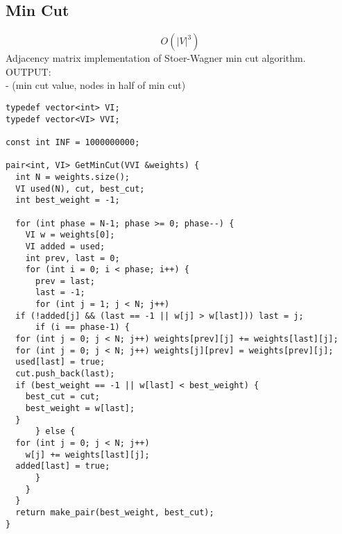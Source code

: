 \documentclass[11pt, oneside]{article}
\begin{document}
\subsection{Min Cut}
\[O(|V|^3)\]
Adjacency matrix implementation of Stoer-Wagner min cut algorithm.\\
OUTPUT:\\
    - (min cut value, nodes in half of min cut)\\
\begin{lstlisting}
typedef vector<int> VI;
typedef vector<VI> VVI;

const int INF = 1000000000;

pair<int, VI> GetMinCut(VVI &weights) {
  int N = weights.size();
  VI used(N), cut, best_cut;
  int best_weight = -1;
  
  for (int phase = N-1; phase >= 0; phase--) {
    VI w = weights[0];
    VI added = used;
    int prev, last = 0;
    for (int i = 0; i < phase; i++) {
      prev = last;
      last = -1;
      for (int j = 1; j < N; j++)
  if (!added[j] && (last == -1 || w[j] > w[last])) last = j;
      if (i == phase-1) {
  for (int j = 0; j < N; j++) weights[prev][j] += weights[last][j];
  for (int j = 0; j < N; j++) weights[j][prev] = weights[prev][j];
  used[last] = true;
  cut.push_back(last);
  if (best_weight == -1 || w[last] < best_weight) {
    best_cut = cut;
    best_weight = w[last];
  }
      } else {
  for (int j = 0; j < N; j++)
    w[j] += weights[last][j];
  added[last] = true;
      }
    }
  }
  return make_pair(best_weight, best_cut);
}
\end{lstlisting}
\end{document}

